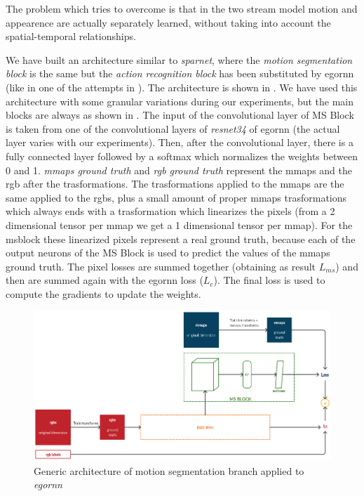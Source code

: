 \documentclass[10pt,twocolumn,hidelinks,letterpaper]{article}
\begin{document}
The problem which \cite{sparnet} tries to overcome is that in the two stream model motion and appearence are actually separately learned, without taking into account the spatial-temporal relationships.

We have built an architecture similar to \textit{sparnet}, where the \textit{motion segmentation block} is the same but the \textit{action recognition block} has been substituted by egornn (like in one of the attempts in \cite{sparnet}). The architecture is shown in . We have used this architecture with some granular variations during our experiments, but the main blocks are always as shown in . The input of the convolutional layer of MS Block is taken from one of the convolutional layers of \textit{resnet34} of egornn (the actual layer varies with our experiments). Then, after the convolutional layer, there is a fully connected layer followed by a softmax which normalizes the weights between 0 and 1. \textit{mmaps ground truth} and \textit{rgb ground truth} represent the mmaps and the rgb after the trasformations. The trasformations applied to the mmaps are the same applied to the rgbs, plus a small amount of proper mmaps trasformations which always ends with a trasformation which linearizes the pixels (from a 2 dimensional tensor per mmap we get a 1 dimensional tensor per mmap). For the msblock these linearized pixels represent a real ground truth, because each of the output neurons of the MS Block is used to predict the values of the mmaps ground truth. The pixel losses are summed together (obtaining as result $L_{ms}$) and then are summed again with the egornn loss ($L_c$). The final loss is used to compute the gradients to update the weights.

\begin{figure}
	\centering
	\includegraphics[width=\linewidth]{images/egornn+msblock_architecture.png}
	\caption{Generic architecture of motion segmentation branch applied to \textit{egornn}}
	\label{msblock_arch}
\end{figure}
\end{document}
